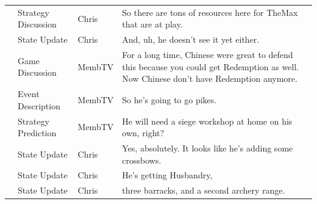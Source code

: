 {\begin{longtable}{@{}>{\theAppRow}r|L{2.3cm}L{1.0cm}U{11.55cm}@{}}
    & Strategy Discussion   & Chris        & So there are tons of resources here for TheMax that are at play.                                                                                                                                                                                                 \\
    & State Update          & Chris        & And, uh, he doesn't see it yet either.                                                                                                                                                                                                                           \\
    & Game Discussion      & MembTV       & For a long time, Chinese were great to defend this because you could get Redemption as well. Now Chinese don't have Redemption anymore.                                                                                                                          \\
    & Event Description     & MembTV       & So he's going to go pikes.                                                                                                                                                                                                                                       \\
    & Strategy Prediction   & MembTV       & He will need a siege workshop at home on his own, right?                                                                                                                                                                                                         \\
    & State Update          & Chris        & Yes, absolutely. It looks like he's adding some crossbows.                                                                                                                                                                                                       \\
    & State Update          & Chris        & He's getting Husbandry,                                                                                                                                                                                                                                          \\
    & State Update          & Chris        & three barracks, and a second archery range.                                                                                                                                                                                                                      \\

\end{longtable}}
